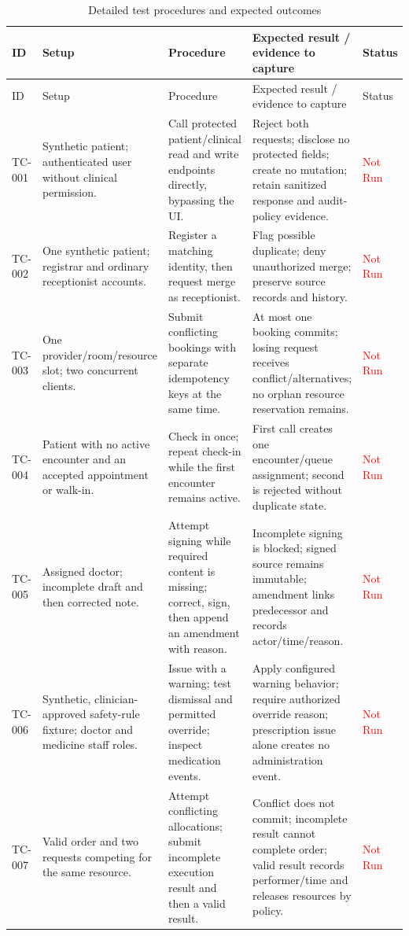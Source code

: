 \documentclass[a4paper,12pt]{article}
\newcommand{\weak}[1]{\textcolor{red}{#1}}
\begin{document}
\begin{longtable}{@{}p{}p{}p{}p{}p{}@{}}
\caption{Detailed test procedures and expected outcomes}\label{tab:detailed-test-procedures}\\
\toprule ID & Setup & Procedure & Expected result / evidence to capture & Status \\
\midrule
\endfirsthead
\toprule ID & Setup & Procedure & Expected result / evidence to capture & Status \\
\midrule
\endhead
TC-001 & Synthetic patient; authenticated user without clinical permission. & Call protected patient/clinical read and write endpoints directly, bypassing the UI. & Reject both requests; disclose no protected fields; create no mutation; retain sanitized response and audit-policy evidence. & \weak{Not Run} \\
TC-002 & One synthetic patient; registrar and ordinary receptionist accounts. & Register a matching identity, then request merge as receptionist. & Flag possible duplicate; deny unauthorized merge; preserve source records and history. & \weak{Not Run} \\
TC-003 & One provider/room/resource slot; two concurrent clients. & Submit conflicting bookings with separate idempotency keys at the same time. & At most one booking commits; losing request receives conflict/alternatives; no orphan resource reservation remains. & \weak{Not Run} \\
TC-004 & Patient with no active encounter and an accepted appointment or walk-in. & Check in once; repeat check-in while the first encounter remains active. & First call creates one encounter/queue assignment; second is rejected without duplicate state. & \weak{Not Run} \\
TC-005 & Assigned doctor; incomplete draft and then corrected note. & Attempt signing while required content is missing; correct, sign, then append an amendment with reason. & Incomplete signing is blocked; signed source remains immutable; amendment links predecessor and records actor/time/reason. & \weak{Not Run} \\
TC-006 & Synthetic, clinician-approved safety-rule fixture; doctor and medicine staff roles. & Issue with a warning; test dismissal and permitted override; inspect medication events. & Apply configured warning behavior; require authorized override reason; prescription issue alone creates no administration event. & \weak{Not Run} \\
TC-007 & Valid order and two requests competing for the same resource. & Attempt conflicting allocations; submit incomplete execution result and then a valid result. & Conflict does not commit; incomplete result cannot complete order; valid result records performer/time and releases resources by policy. & \weak{Not Run} \\

\end{longtable}
\end{document}
